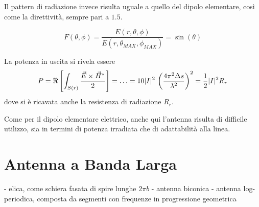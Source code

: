 Il pattern di radiazione invece risulta uguale a quello del dipolo elementare, così come la direttività, sempre pari a $1.5$.

\begin{equation}
	F(\theta, \phi)
	= \frac{E(r, \theta, \phi)}{E(r, \theta_{MAX}, \phi_{MAX})} = \sin(\theta)
\end{equation}

La potenza in uscita si rivela essere
\begin{equation*}
	P
	= \Re \left[
		\int_{S(r)} \frac{\vec{E} \times \vec{H}^*}{2}
	\right]
	= \ldots
	= 10 |I|^2 \, \left(
		\frac{4\pi^2 \Delta s}{\lambda^2}
	\right)^2
	= \frac{1}{2} |I|^2 R_r
\end{equation*}
dove si è ricavata anche la resistenza di radiazione $R_r$.

Come per il dipolo elementare elettrico, anche qui l'antenna risulta di difficile utilizzo, sia in termini di potenza irradiata che di adattabilità alla linea.

\section{Antenna a Banda Larga}
- elica, come schiera fasata di spire lunghe $2\pi b$
- antenna biconica
- antenna log-periodica, composta da segmenti con frequenze in progressione geometrica

